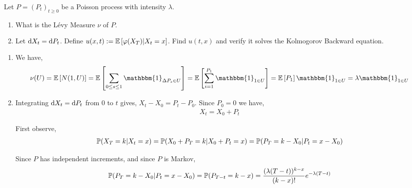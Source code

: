 \begin{problem}[Exercise 10.1]
    Let \( P=(P_t)_{t\geq 0} \) be a Poisson process with intensity \( \lambda \).
    \begin{enumerate}[label=(\alph*)]
        \item What is the L\'evy Measure \( \nu \) of \( P \).
        \item Let \( \mathrm{d} X_t = \mathrm{d} P_t \). Define \( u(x,t):=\mathbb{E} \left[ \varphi(X_T) | X_t = x \right] \). Find \( u(t,x) \) and verify it solves the Kolmogorov Backward equation.
    \end{enumerate}
\end{problem}

\begin{solution}[Solution]
\begin{enumerate}[label=(\alph*)]
    \item 
        We have,
        \begin{align*}
            \nu(U) = \EE \left[ N(1,U) \right] 
            = \EE \left[ \sum_{0\leq s\leq 1} \mathbbm{1}_{\Delta P_s \in U} \right]
            = \EE \left[ \sum_{i=1}^{P_1} \mathbbm{1}_{1\in U} \right]
            = \EE \left[ P_1 \right] \mathbbm{1}_{1\in U}
            = \lambda \mathbbm{1}_{1\in U}
        \end{align*}
       

    \item Integrating \( \mathrm{d} X_t = \mathrm{d} P_t \) from \( 0 \) to \( t \) gives, \( X_t - X_0 = P_t - P_0 \). Since \( P_0 = 0 \) we have,
        \begin{align*}
            X_t = X_0 + P_t
        \end{align*}

        First observe,
        \begin{align*}
            \mathbb{P} (X_T = k | X_t = x)
            =\mathbb{P} (X_0 + P_T = k | X_0 + P_t = x)
            =\mathbb{P} (P_T = k - X_0 | P_t = x - X_0)
        \end{align*}
    
        Since \( P \) has independent increments, and since \( P \) is Markov,
        \begin{align*}
            \mathbb{P} (P_T = k - X_0 | P_t = x - X_0)
            =\mathbb{P} (P_{T-t} = k - x)
            = \dfrac{(\lambda(T-t))^{k-x}}{(k-x)!}e^{-\lambda (T-t)}
        \end{align*} 
        

\end{enumerate}
\end{solution}
